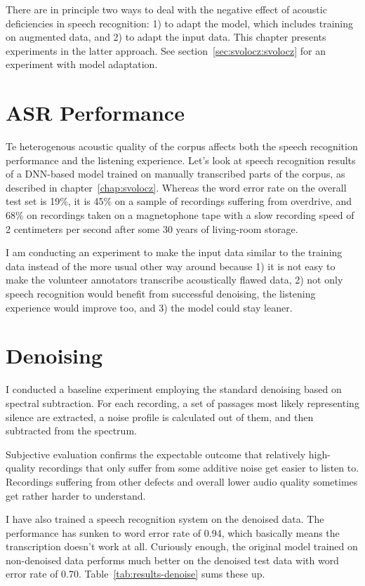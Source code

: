 \documentclass[12pt,a4paper]{report}
\begin{document}
There are in principle two ways to deal with the negative effect of acoustic
deficiencies in speech recognition: 1) to adapt the model, which includes
training on augmented data, and 2) to adapt the input data. This chapter
presents experiments in the latter approach. See
section~\ref{sec:svolocz:svolocz} for an experiment with model adaptation.

\section{ASR Performance}

Te heterogenous acoustic quality of the corpus affects both the speech recognition
performance and the listening experience. Let's look at speech recognition results
of a DNN-based model trained on manually transcribed parts of the corpus, as  described in chapter~\ref{chap:svolocz}. Whereas the word error rate on the
overall test set is 19\%, it is 45\% on a sample of recordings suffering from
overdrive, and 68\% on recordings taken on a magnetophone tape with a slow
recording speed of 2 centimeters per second after some 30 years of living-room
storage.

I am conducting an experiment to make the input data similar to the training
data instead of the more usual other way around because 1) it is not easy to
make the volunteer annotators transcribe acoustically flawed data, 2) not only
speech recognition would benefit from successful denoising, the listening
experience would improve too, and 3) the model could stay leaner.

\section{Denoising}

I conducted a baseline experiment employing the standard denoising based on
spectral subtraction. For each recording, a set of passages most likely
representing silence are extracted, a noise profile is calculated out of them,
and then subtracted from the spectrum.

Subjective evaluation confirms the expectable outcome that relatively
high-quality recordings that only suffer from some additive noise get
easier to listen to. Recordings suffering from other defects and overall lower
audio quality sometimes get rather harder to understand.

I have also trained a speech recognition system on the denoised data. The
performance has sunken to word error rate of 0.94, which basically means the
transcription doesn't work at all. Curiously enough, the
original model trained on non-denoised data performs much better on the denoised
test data with word error rate of 0.70. Table~\ref{tab:results-denoise} sums
these up.
\end{document}
